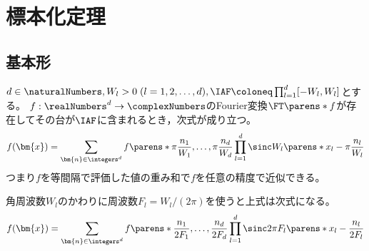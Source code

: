 \chapter{標本化定理}
    \section{基本形}
        \label{標本化定理の基本形}
        \begin{shadebox}
            $d\in\naturalNumbers,W_l>0\;(l=1,2,\dots,d),\IAF\coloneq\prod_{l=1}^d [-W_l,W_l]$とする。
            $f:\realNumbers^d\to\complexNumbers$のFourier変換$\FT\parens*{f}$が存在してその台が$\IAF$に含まれるとき，次式が成り立つ。
            \[ f(\bm{x}) = \sum_{\bm{n}\in\integers^d}f\parens*{\pi\frac{n_1}{W_1},\dots,\pi\frac{n_d}{W_d}}\prod_{l=1}^d\sinc W_l\parens*{x_l - \pi\frac{n_l}{W_l}} \]
            つまり$f$を等間隔で評価した値の重み和で$f$を任意の精度で近似できる。
            \par
            角周波数$W_l$のかわりに周波数$F_l=W_l/(2\pi)$を使うと上式は次式になる。
            \begin{equation}
                f(\bm{x}) = \sum_{\bm{n}\in\integers^d}f\parens*{\frac{n_1}{2F_1},\dots,\frac{n_d}{2F_d}}\prod_{l=1}^d\sinc 2\pi F_l\parens*{x_l - \frac{n_l}{2F_l}}
                \label{equation:標本化定理の基本形の周波数版}
            \end{equation}
        \end{shadebox}
